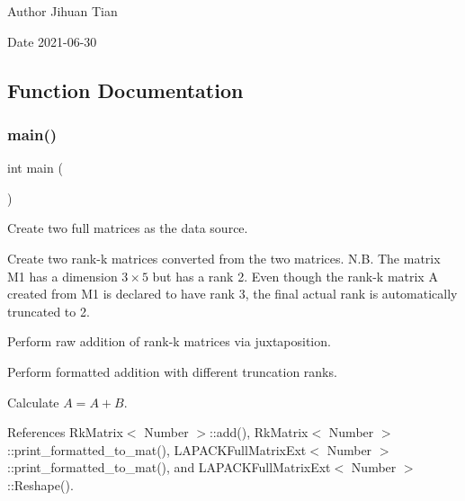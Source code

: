 \begin{DoxyAuthor}{Author}
Jihuan Tian 
\end{DoxyAuthor}
\begin{DoxyDate}{Date}
2021-\/06-\/30 
\end{DoxyDate}


\subsection{Function Documentation}
\mbox{\label{rkmatrix-add-formatted_8cc_ae66f6b31b5ad750f1fe042a706a4e3d4}} 
\subsubsection{\texorpdfstring{main()}{main()}}
{\footnotesize\ttfamily int main (\begin{DoxyParamCaption}{ }\end{DoxyParamCaption})}

Create two full matrices as the data source.

Create two rank-\/k matrices converted from the two matrices. N.\+B. The matrix {\ttfamily M1} has a dimension $3 \times 5$ but has a rank 2. Even though the rank-\/k matrix {\ttfamily A} created from {\ttfamily M1} is declared to have rank 3, the final actual rank is automatically truncated to 2.

Perform raw addition of rank-\/k matrices via juxtaposition.

Perform formatted addition with different truncation ranks.

Calculate $A = A + B$.

References Rk\+Matrix$<$ Number $>$\+::add(), Rk\+Matrix$<$ Number $>$\+::print\+\_\+formatted\+\_\+to\+\_\+mat(), L\+A\+P\+A\+C\+K\+Full\+Matrix\+Ext$<$ Number $>$\+::print\+\_\+formatted\+\_\+to\+\_\+mat(), and L\+A\+P\+A\+C\+K\+Full\+Matrix\+Ext$<$ Number $>$\+::\+Reshape().

